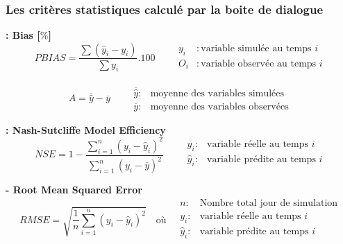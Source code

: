 \subsubsection{Les critères statistiques calculé par la boite de dialogue }

\textbf{ : Bias [$\%$]}
\begin{equation*}
PBIAS = \frac{\sum(\hat{y}_i -y_i)}{\sum y_i} . 100
\quad \quad
\begin{array}{rl}
      
      y_i & : \text{variable simulée au temps $i$}\\
      O_i & : \text{variable observée au temps $i$}\\
\end{array}  
\end{equation*}

\textbf{}
\begin{equation*}
    A = \overline{\hat{y}} - \overline{y}
    \quad\quad
    \begin{array}{cc}
         \overline{\hat{y}} :& \text{moyenne des variables simulées} \\
         \overline{y} : & \text{moyenne des variables observées}
    \end{array}
\end{equation*}

\textbf{ : Nash-Sutcliffe Model Efficiency} \citep{nash1970}
\begin{equation*}
    NSE = 1 - \frac{\sum_{i=1}^n (y_i - \hat{y}_i)^2}{\sum_{i=1}^n (y_i - \overline{y})^2}
    \quad \quad 
    \begin{array}{ll}
         y_i :& \text{variable réelle au temps } i \\
        \hat{y}_i :& \text{variable prédite au temps } i \\
    \end{array}
\end{equation*}

\textbf{ - Root Mean Squared Error} 
\begin{equation*}
RMSE = \sqrt{\frac{1}{n} \sum_{i=1}^{n} (y_i - \hat{y}_i)^2}
\quad \text{où} \quad
\begin{array}{ll}
    n :& \text{Nombre total jour de simulation} \\
    y_i :& \text{variable réelle au temps } i \\
    \hat{y}_i :& \text{variable prédite au temps } i \\
\end{array}
\end{equation*}

